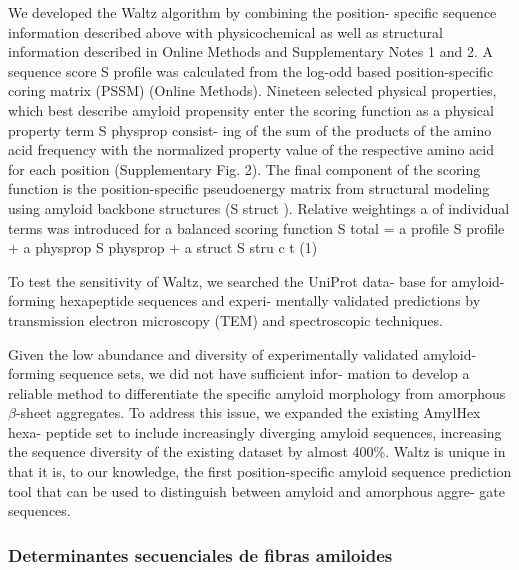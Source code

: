 We developed the Waltz algorithm by combining the position-
specific sequence information described above with physicochemical as well as structural information described in Online
Methods and Supplementary Notes 1 and 2. A sequence score
S profile was calculated from the log-odd based position-specific
coring matrix (PSSM) (Online Methods). Nineteen selected
physical properties, which best describe amyloid propensity enter
the scoring function as a physical property term S physprop consist-
ing of the sum of the products of the amino acid frequency with
the normalized property value of the respective amino acid for
each position (Supplementary Fig. 2). The final component of
the scoring function is the position-specific pseudoenergy matrix
from structural modeling using amyloid backbone structures
(S struct ). Relative weightings a of individual terms was introduced
for a balanced scoring function
S total = a profile S profile + a physprop S physprop + a struct S stru c t (1)

To test the sensitivity of Waltz, we searched the UniProt data-
base for amyloid-forming hexapeptide sequences and experi-
mentally validated predictions by transmission electron
microscopy (TEM) and spectroscopic techniques.




Given
the low abundance and diversity of experimentally validated
amyloid-forming sequence sets, we did not have sufficient infor-
mation to develop a reliable method to differentiate the specific
amyloid morphology from amorphous $\beta$-sheet aggregates.
To address this issue, we expanded the existing AmylHex hexa-
peptide set to include increasingly diverging amyloid sequences,
increasing the sequence diversity of the existing dataset by almost
400\%. Waltz is unique in that it is, to our knowledge, the first
position-specific amyloid sequence prediction tool that can be
used to distinguish between amyloid and amorphous aggre-
gate sequences.







\subsubsection{Determinantes secuenciales de fibras amiloides}

